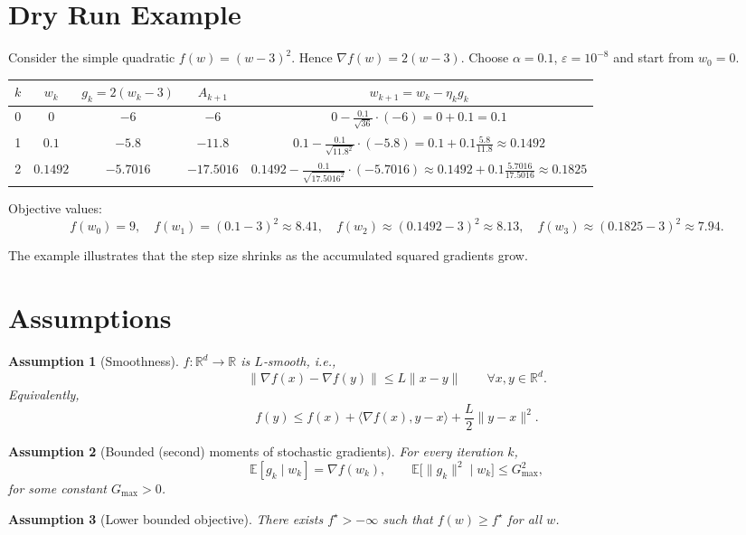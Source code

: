 \documentclass{article}
\newtheorem{assumption}{Assumption}
\begin{document}
\section*{Dry Run Example}
Consider the simple quadratic $f(w)=(w-3)^2$.
Hence $\nabla f(w)=2(w-3)$.  
Choose $\alpha=0.1$, $\varepsilon=10^{-8}$ and start from $w_0=0$.

\begin{center}
\begin{tabular}{c|c|c|c|c}
$k$ & $w_k$ & $g_k=2(w_k-3)$ & $A_{k+1}$ & $w_{k+1}=w_k-\eta_k g_k$\\ \hline
0 & $0$ & $-6$ & $-6$ & $\displaystyle 0-\frac{0.1}{\sqrt{36}}\cdot(-6)=0+0.1=0.1$\\[4pt]
1 & $0.1$ & $-5.8$ & $-11.8$ & $\displaystyle 0.1-\frac{0.1}{\sqrt{11.8^{2}}}\cdot(-5.8)
               =0.1+0.1\frac{5.8}{11.8}\approx0.1492$\\[4pt]
2 & $0.1492$ & $-5.7016$ & $-17.5016$ &
 $\displaystyle 0.1492-\frac{0.1}{\sqrt{17.5016^{2}}}\cdot(-5.7016)
 \approx0.1492+0.1\frac{5.7016}{17.5016}\approx0.1825$
\end{tabular}
\end{center}

Objective values:
\[
f(w_0)=9,\quad f(w_1)=(0.1-3)^2\approx8.41,\quad
f(w_2)\approx(0.1492-3)^2\approx8.13,\quad
f(w_3)\approx(0.1825-3)^2\approx7.94 .
\]

The example illustrates that the step size shrinks as the accumulated squared gradients grow.

\newpage
\section*{Assumptions}
\begin{assumption}[Smoothness]\label{ass:smooth}
$f:\mathbb{R}^d\rightarrow\mathbb{R}$ is $L$‑smooth, i.e.,
\[
\|\nabla f(x)-\nabla f(y)\|\le L\|x-y\|\qquad\forall x,y\in\mathbb{R}^d .
\]
Equivalently,
\[
f(y)\le f(x)+\langle\nabla f(x),y-x\rangle+\frac{L}{2}\|y-x\|^{2}.
\]
\end{assumption}
\begin{assumption}[Bounded (second) moments of stochastic gradients]\label{ass:bounded}
For every iteration $k$,
\[
\mathbb{E}[g_k\mid w_k]=\nabla f(w_k),\qquad 
\mathbb{E}\big[\|g_k\|^{2}\mid w_k\big]\le G_{\max }^{2},
\]
for some constant $G_{\max}>0$.
\end{assumption}
\begin{assumption}[Lower bounded objective]\label{ass:lower}
There exists $f^{\star}>-\infty$ such that $f(w)\ge f^{\star}$ for all $w$.
\end{assumption}
\end{document}
